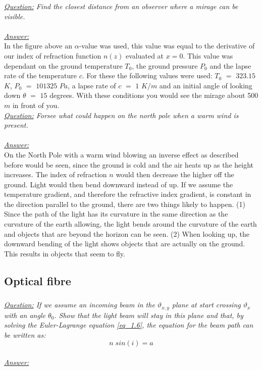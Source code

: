 \documentclass{article}
\begin{document}
\textit{\underline{Question:} Find the closest distance from an observer where a mirage can be visible.}\\
\\
\textit{\underline{Answer:}} \\
In the figure above an $\alpha$-value was used, this value was equal to the derivative of our index of refraction function $n(z)$ evaluated at $x=0$. This value was dependant on the ground temperature $T_0$, the ground pressure $P_0$ and the lapse rate of the temperature $c$. For these the following values were used: $T_0$ $=$ $323.15$ $K$, $P_0$ $=$ $101325$ $Pa$, a lapse rate of $c$ $=$ $1$ $K/m$ and an initial angle of looking down $\theta$ $=$ $15$ degrees. With these conditions you would see the mirage about 500 $m$ in front of you.\\

\textit{\underline{Question:} Forsee what could happen on the north pole when a warm wind is present.}\\
\\
\textit{\underline{Answer:}} \\
On the North Pole with a warm wind blowing an inverse effect as described before would be seen, since the ground is cold and the air heats up as the height increases. The index of refraction $n$ would then decrease the higher off the ground. Light would then bend downward instead of up. If we assume the temperature gradient, and therefore the refractive index gradient, is constant in the direction parallel to the ground, there are two things likely to happen. (1) Since the path of the light has its curvature in the same direction as the curvature of the earth allowing, the light bends around the curvature of the earth and objects that are beyond the horizon can be seen. (2) When looking up, the downward bending of the light shows objects that are actually on the ground. This results in objects that seem to fly.\\

\subsection{Optical fibre}

\subsubsection{}

\textit{\underline{Question:} If we assume an incoming beam in the $\vartheta _{x,y}$ plane at start crossing $\vartheta _x$ with an angle $\theta _0$. Show that the light beam will stay in this plane and that, by solving the Euler-Lagrange equation \ref{eq_1.6}, the equation for the beam path can be written as:}\\
\begin{equation}
	n \; sin(i) = a
	\label{eq_2.1}
\end{equation}
\\
\textit{\underline{Answer:}} \\
\\
\end{document}
